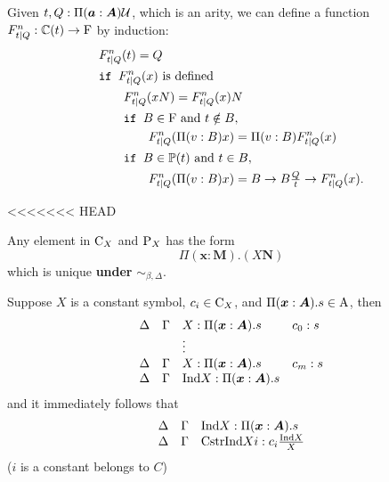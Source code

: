 \begin{definition}
  Given $t, Q : \Pi (\boldsymbol{a} : \boldsymbol{A}) \mathcal{U}$, which is an arity, we can define a function $F^{n}_{t|Q}:\mathbb{C}(t) \to \mathrm{F}$ by induction:
  \begin{align*}
    & F^{n}_{t|Q} (t) = Q \\
    & \texttt{if } F^{n}_{t|Q} (x) \text{ is defined}\\
    & \qquad F^{n}_{t|Q} ( xN ) = F^{n}_{t|Q} (x) N \\
    & \qquad \texttt{if } B \in \mathrm{F}\text{ and } t \notin B, \\
    & \qquad \qquad F^{n}_{t|Q} (\Pi(v : B) x) = \Pi(v : B) F^{n}_{t|Q}(x) \\
    & \qquad  \texttt{if } B \in \mathbb{P}(t) \text{ and } t \in B, \\ 
    & \qquad \qquad F^{n}_{t|Q}(\Pi(v : B) x) = B \rightarrow B\tfrac{Q}{t} \rightarrow F^{n}_{t|Q} (x).
  \end{align*}

\end{definition}




<<<<<<< HEAD
\begin{proposition}
  Any element in $\mathrm{C}_X$ and $\mathrm{P}_X$ has the form 
  \[
    \Pi (\bm x : \bm M) . (X \bm N)
  \]
  which is unique \textbf{under} $\sim_{\beta, \Delta}$.
\end{proposition}








Suppose $X$ is a constant symbol, $c_i \in \mathrm{C}_X$, and $\Pi (\boldsymbol{x}: \boldsymbol{A}).s \in \rm A$, then
\[
  \begin{array}{llll}
    \Delta   &\Gamma   &X: \Pi (\boldsymbol{x}: \boldsymbol{A}).s   &c_0 : s\\
             &         &\vdots                    &       \\
    \Delta   &\Gamma   &X: \Pi (\boldsymbol{x}: \boldsymbol{A}).s   &c_m : s\\
    \Delta   &\Gamma   &\mathrm{Ind} X :  \Pi (\boldsymbol{x}: \boldsymbol{A}).s   &
  \end{array}
\]
and it immediately follows that
\[
  \begin{array}{lll}
    \Delta   &\Gamma   &\mathrm{Ind} X :  \Pi (\boldsymbol{x}: \boldsymbol{A}).s \\
    \Delta   &\Gamma   &\mathrm{Cstr} \mathrm{Ind} X i : c_i \frac{\mathrm{Ind} X}{X}
  \end{array}
\]
($i$ is a constant belongs to $C$)





